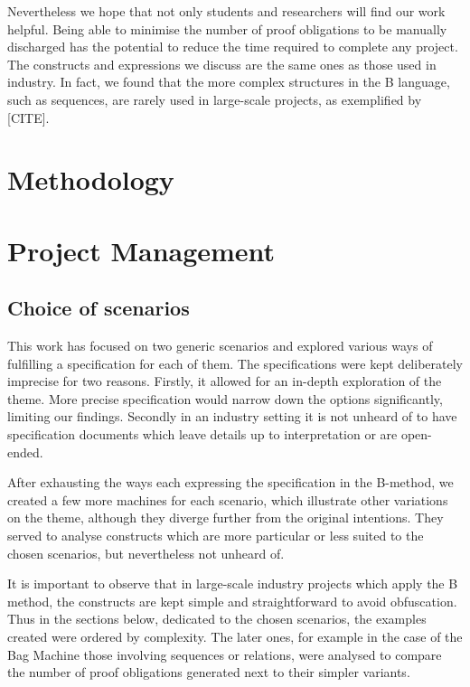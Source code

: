 \documentclass[11pt,journal]{IEEEtran}
\begin{document}
	Nevertheless we hope that not only students and researchers will find our work helpful. Being able to minimise the number of proof obligations to be manually discharged has the potential to reduce the time required to complete any project. The constructs and expressions we discuss are the same ones as those used in industry. In fact, we found that the more complex structures in the B language, such as sequences, are rarely used in large-scale projects, as exemplified by [CITE].


	\section{Methodology}
	

	\section{Project Management}
	
	\subsection{Choice of scenarios}
	This work has focused on two generic scenarios and explored various ways of fulfilling a specification for each of them. The specifications were kept deliberately imprecise for two reasons. Firstly, it allowed for an in-depth exploration of the theme. More precise specification would narrow down the options significantly, limiting our findings. Secondly in an industry setting it is not unheard of to have specification documents which leave details up to interpretation or are open-ended. 
	
	After exhausting the ways each expressing the specification in the B-method, we created a few more machines for each scenario, which illustrate other variations on the theme, although they diverge further from the original intentions. They served to analyse constructs which are more particular or less suited to the chosen scenarios, but nevertheless not unheard of.
	
	It is important to observe that in large-scale industry projects which apply the B method, the constructs are kept simple and straightforward to avoid obfuscation. Thus in the sections below, dedicated to the chosen scenarios, the examples created were ordered by complexity. The later ones, for example in the case of the Bag Machine those involving sequences or relations, were analysed to compare the number of proof obligations generated next to their simpler variants.
	
\end{document}
